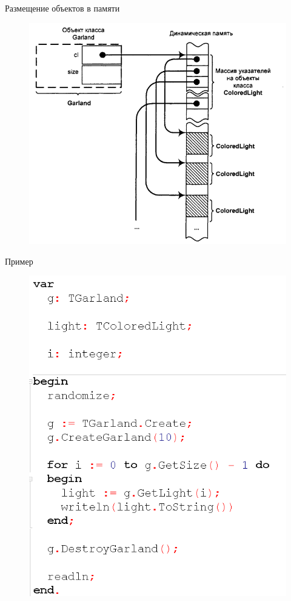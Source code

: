\documentclass{beamer}
\begin{document}
\begin{frame}{Размещение объектов в памяти}
\begin{figure}[h]
\centering
\includegraphics[scale=0.5]{images/lec04-pic16.png}
\end{figure}
\end{frame}

\begin{frame}{Пример}
\begin{figure}[h]
\centering
\includegraphics[scale=0.5]{images/lec04-pic17.png}
\end{figure}
\end{frame}
\end{document}
